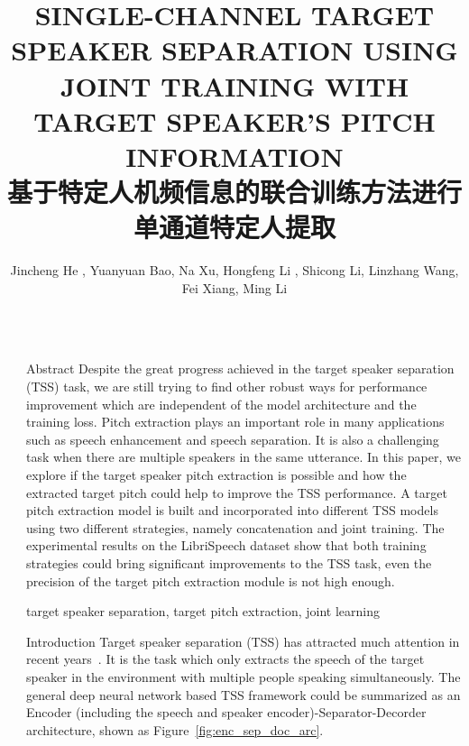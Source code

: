 \documentclass[final]{beamer}
\title{SINGLE-CHANNEL TARGET SPEAKER SEPARATION USING JOINT TRAINING WITH TARGET SPEAKER'S PITCH INFORMATION \\ 基于特定人机频信息的联合训练方法进行单通道特定人提取}
\author{Jincheng He \inst{1}, Yuanyuan Bao\inst{1}, Na Xu\inst{2}, Hongfeng Li \inst{2}, Shicong Li\inst{2}, Linzhang Wang\inst{2}, Fei Xiang\inst{2}, Ming Li\inst{1}}
\institute[shortinst]{\inst{1} Data Science Research Center, Duke Kunshan University, Kunshan, China \samelineand \inst{2} Xiaomi, Beijing, China \\ ming.li369@duke.edu}
\newlength{\sepwidth}
\newlength{\colwidth}
\newcommand{\separatorcolumn}{\begin{column}{\sepwidth}\end{column}}
\begin{document}

    \begin{frame}[t]
        \begin{columns}[t]
            \separatorcolumn

            \begin{column}{\colwidth}

                \begin{block}{Abstract}
                    Despite the great progress achieved in the target speaker separation (TSS) task, we are still trying to find other robust ways for performance improvement which are independent of the model architecture and the training loss. Pitch extraction plays an important role in many applications such as speech enhancement and speech separation. It is also a challenging task when there are multiple speakers in the same utterance. In this paper, we explore if the target speaker pitch extraction is possible and how the extracted target pitch could help to improve the TSS performance. A target pitch extraction model is built and incorporated into different TSS models using two different strategies, namely concatenation and joint training. The experimental results on the LibriSpeech dataset show that both training strategies could bring significant improvements to the TSS task, even the precision of the target pitch extraction module is not high enough.

                    \begin{keywords}
                        target speaker separation, target pitch extraction, joint learning
                    \end{keywords}
                \end{block}

                \begin{block}{Introduction}
                    Target speaker separation (TSS) has attracted much attention in recent years~\cite{speakerBeam, compact_speakerbeam, voicefilter, li20p_interspeech, time_domain_speaker_ex_net, spex, spex+, speakerfilter, speakerfilter_pro}.
                    It is the task which only extracts the speech of the target speaker in the environment with multiple people speaking simultaneously.
                    The general deep neural network based TSS framework could be summarized as an Encoder (including the speech and speaker encoder)-Separator-Decorder architecture, shown as Figure~\ref{fig:enc_sep_doc_arc}.


\end{block}
\end{column}
\end{columns}
\end{frame}
\end{document}
